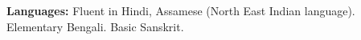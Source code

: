 \textbf{Languages:} Fluent in Hindi, Assamese (North East Indian language). Elementary Bengali. Basic Sanskrit.